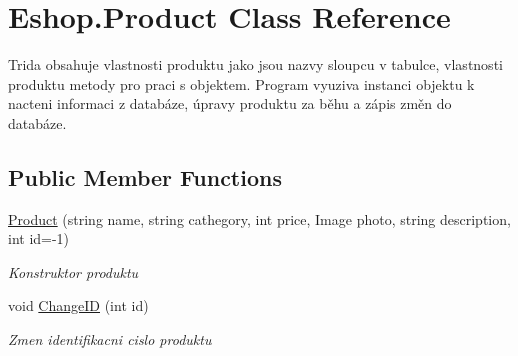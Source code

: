 \hypertarget{class_eshop_1_1_product}{}\section{Eshop.\+Product Class Reference}
\label{class_eshop_1_1_product}


Trida obsahuje vlastnosti produktu jako jsou nazvy sloupcu v tabulce, vlastnosti produktu metody pro praci s objektem. Program vyuziva instanci objektu k nacteni informaci z databáze, úpravy produktu za běhu a zápis změn do databáze.  


\subsection*{Public Member Functions}
\begin{DoxyCompactItemize}
\item 
\mbox{\hyperlink{class_eshop_1_1_product_aea293eb52fdb7166d444373a0d80ae15}{Product}} (string name, string cathegory, int price, Image photo, string description, int id=-\/1)
\begin{DoxyCompactList}\small\item\em Konstruktor produktu \end{DoxyCompactList}\item 
void \mbox{\hyperlink{class_eshop_1_1_product_add753283bbce6490fc826887736a99be}{Change\+ID}} (int id)
\begin{DoxyCompactList}\small\item\em Zmen identifikacni cislo produktu \end{DoxyCompactList}\end{DoxyCompactItemize}
